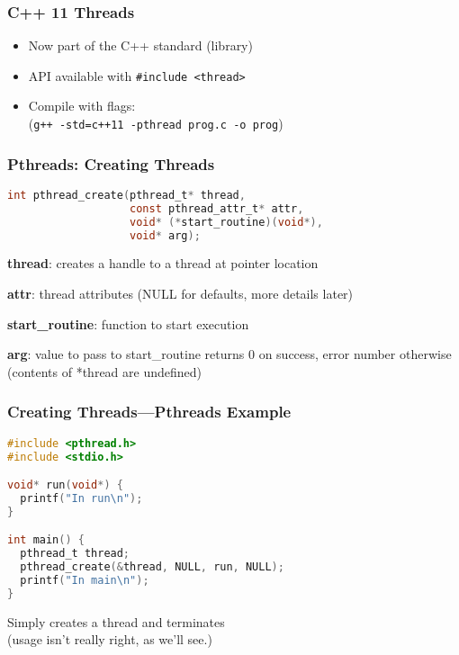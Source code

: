 
\begin{frame}[fragile]
  \frametitle{C++ 11 Threads}


  \begin{itemize}
    \item Now part of the C++ standard (library)
    \vfill
    \item API available with {\tt \#include <thread>}
    \vfill
    \item Compile with flags: \\ (\verb!g++ -std=c++11 -pthread prog.c -o prog!)
  \end{itemize}

\end{frame}


\begin{frame}[fragile]
  \frametitle{Pthreads: Creating Threads}


  \begin{lstlisting}[language=C]
int pthread_create(pthread_t* thread, 
                   const pthread_attr_t* attr,
                   void* (*start_routine)(void*),
                   void* arg);
  \end{lstlisting}
  \vfill
  {\bf thread}: creates a handle to a thread at pointer location

  {\bf attr}: thread attributes (NULL for defaults, more details later)

  {\bf start\_routine}: function to start execution

  {\bf arg}: value to pass to start\_routine
  \vfill
  returns 0 on success, error number otherwise\\(contents of *thread are
  undefined)

\end{frame}

\begin{frame}[fragile]
  \frametitle{Creating Threads---Pthreads Example}


\begin{lstlisting}[language=C]
#include <pthread.h>
#include <stdio.h>

void* run(void*) {
  printf("In run\n");
}

int main() {
  pthread_t thread;
  pthread_create(&thread, NULL, run, NULL);
  printf("In main\n");
}
\end{lstlisting}
  \vfill
  Simply creates a thread and terminates\\(usage isn't really right, as we'll
  see.)

\end{frame}

